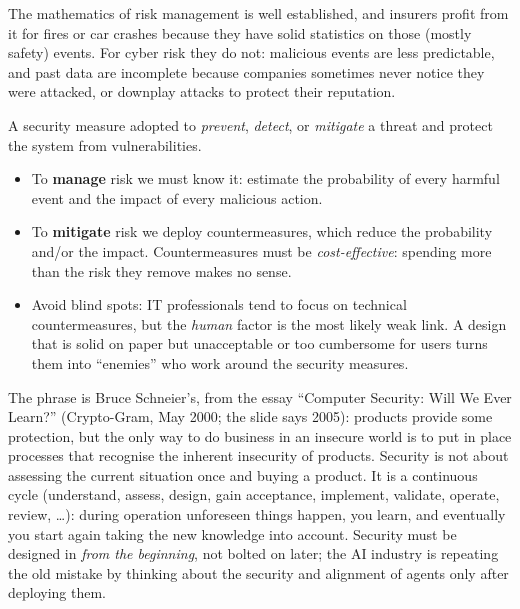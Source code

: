 \begin{remark}
The mathematics of risk management is well established, and insurers profit from it for fires or car crashes because they have solid statistics on those (mostly safety) events. For cyber risk they do not: malicious events are less predictable, and past data are incomplete because companies sometimes never notice they were attacked, or downplay attacks to protect their reputation.
\end{remark}

\begin{definition}[Countermeasure]
A security measure adopted to \emph{prevent}, \emph{detect}, or \emph{mitigate} a threat and protect the system from vulnerabilities.
\end{definition}

\begin{itemize}
    \item To \textbf{manage} risk we must know it: estimate the probability of every harmful event and the impact of every malicious action.
    \item To \textbf{mitigate} risk we deploy countermeasures, which reduce the probability and/or the impact. Countermeasures must be \emph{cost-effective}: spending more than the risk they remove makes no sense.
    \item Avoid blind spots: IT professionals tend to focus on technical countermeasures, but the \emph{human} factor is the most likely weak link. A design that is solid on paper but unacceptable or too cumbersome for users turns them into \enquote{enemies} who work around the security measures.
\end{itemize}

\begin{remark}
The phrase is Bruce Schneier's, from the essay \enquote{Computer Security: Will We Ever Learn?} (Crypto-Gram, May 2000; the slide says 2005): products provide some protection, but the only way to do business in an insecure world is to put in place processes that recognise the inherent insecurity of products. Security is not about assessing the current situation once and buying a product. It is a continuous cycle (understand, assess, design, gain acceptance, implement, validate, operate, review, \dots): during operation unforeseen things happen, you learn, and eventually you start again taking the new knowledge into account. Security must be designed in \emph{from the beginning}, not bolted on later; the AI industry is repeating the old mistake by thinking about the security and alignment of agents only after deploying them.
\end{remark}

